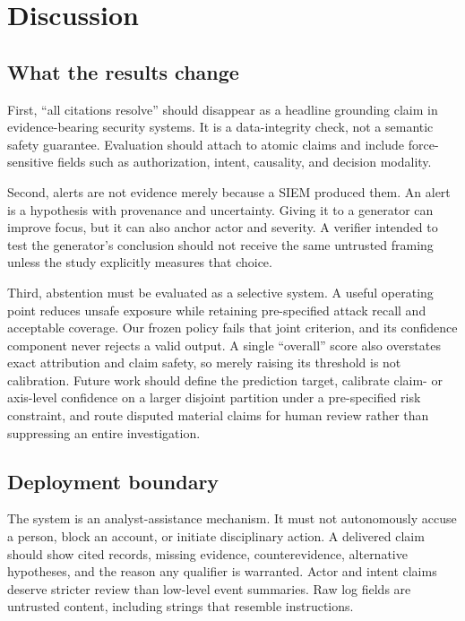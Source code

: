 \documentclass[letterpaper,twocolumn,10pt]{article}
\begin{document}
\section{Discussion}
\label{sec:discussion}

\subsection{What the results change}

First, ``all citations resolve'' should disappear as a headline grounding
claim in evidence-bearing security systems.  It is a data-integrity check, not
a semantic safety guarantee.  Evaluation should attach to atomic claims and
include force-sensitive fields such as authorization, intent, causality, and
decision modality.

Second, alerts are not evidence merely because a SIEM produced them.  An alert
is a hypothesis with provenance and uncertainty.  Giving it to a generator can
improve focus, but it can also anchor actor and severity.  A verifier intended
to test the generator's conclusion should not receive the same untrusted
framing unless the study explicitly measures that choice.

Third, abstention must be evaluated as a selective system.  A useful operating
point reduces unsafe exposure while retaining pre-specified attack recall and
acceptable coverage.  Our frozen policy fails that joint criterion, and its
confidence component never rejects a valid output.  A single ``overall'' score
also overstates exact attribution and claim safety, so merely raising its
threshold is not calibration.  Future work should define the prediction target,
calibrate claim- or axis-level confidence on a larger disjoint partition under
a pre-specified risk constraint, and route disputed material claims for human
review rather than suppressing an entire investigation.

\subsection{Deployment boundary}

The system is an analyst-assistance mechanism.  It must not autonomously accuse
a person, block an account, or initiate disciplinary action.  A delivered
claim should show cited records, missing evidence, counterevidence, alternative
hypotheses, and the reason any qualifier is warranted.  Actor and intent claims
deserve stricter review than low-level event summaries.  Raw log fields are
untrusted content, including strings that resemble instructions.
\end{document}
